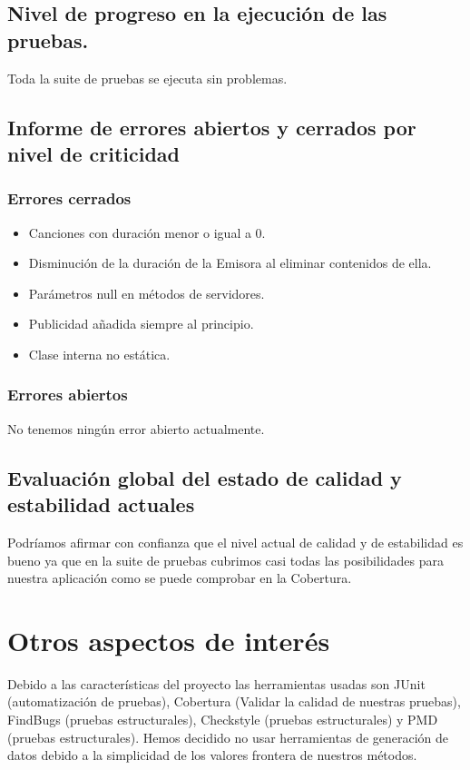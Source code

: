 \documentclass[DIV=calc,paper=a4,fontsize=11pt,onecolumn]{scrartcl}	 %
\begin{document}
  \subsection{Nivel de progreso en la ejecución de las pruebas.}
  	Toda la suite de pruebas se ejecuta sin problemas.
  \subsection{Informe de errores abiertos y cerrados por nivel de criticidad}
  	\subsubsection{Errores cerrados}
      \begin{itemize}
          \item Canciones con duración menor o igual a 0.
          \item Disminución de la duración de la Emisora al eliminar contenidos de ella.
          \item Parámetros null en métodos de servidores.
          \item Publicidad añadida siempre al principio.
          \item Clase interna no estática.
      \end{itemize}
 	\subsubsection{Errores abiertos}
    	No tenemos ningún error abierto actualmente.
  \subsection{Evaluación global del estado de calidad y estabilidad actuales}
	Podríamos afirmar con confianza que el nivel actual de calidad y de estabilidad es bueno ya que en la suite de pruebas cubrimos casi todas las posibilidades para nuestra aplicación como se puede comprobar en la Cobertura.

\clearpage

\section{Otros aspectos de interés}

Debido a las características del proyecto las herramientas usadas son JUnit (automatización de pruebas), Cobertura (Validar la calidad de nuestras pruebas), FindBugs (pruebas estructurales), Checkstyle (pruebas estructurales) y PMD (pruebas estructurales).
Hemos decidido no usar herramientas de generación de datos debido a la simplicidad de los valores frontera de nuestros métodos.
\end{document}

